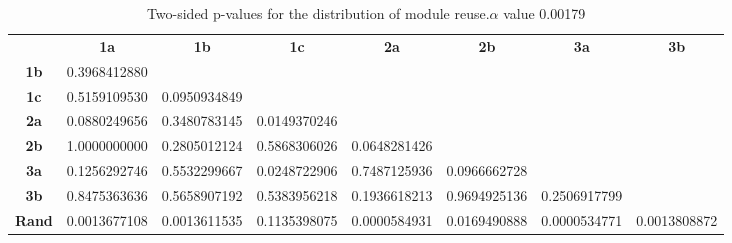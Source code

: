 \begin{table}[h!]
    \centering
    \begin{tabular}{cccccccc}
                              & \textbf{1a}        & \textbf{1b}        & \textbf{1c}  & \textbf{2a}        & \textbf{2b}        & \textbf{3a}        & \textbf{3b}        \\
    \textbf{1b}               & 0.3968412880       &                    &              &                    &                    &                    &                    \\
    \textbf{1c}               & 0.5159109530       & 0.0950934849       &              &                    &                    &                    &                    \\
    \textbf{2a}               & 0.0880249656       & 0.3480783145       & 0.0149370246 &                    &                    &                    &                    \\
    \textbf{2b}               & 1.0000000000       & 0.2805012124       & 0.5868306026 & 0.0648281426       &                    &                    &                    \\
    \textbf{3a}               & 0.1256292746       & 0.5532299667       & 0.0248722906 & 0.7487125936       & 0.0966662728       &                    &                    \\
    \textbf{3b}               & 0.8475363636       & 0.5658907192       & 0.5383956218 & 0.1936618213       & 0.9694925136       & 0.2506917799       &                    \\
    \textbf{Rand}             & 0.0013677108       & 0.0013611535       & 0.1135398075 & 0.0000584931       & 0.0169490888       & 0.0000534771       & 0.0013808872
    \end{tabular}
    \caption[p-table for module reuse]{Two-sided p-values for the distribution of module reuse.\(\alpha\) value 0.00179}
    \label{tab:exp2.reuseptable}
\end{table}